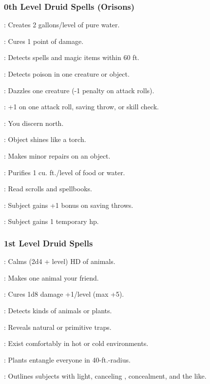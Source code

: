 \subsubsection{0th Level Druid Spells (Orisons)}

: Creates 2 gallons/level of pure water.

: Cures 1 point of damage.

: Detects spells and magic items within 60 ft.

: Detects poison in one creature or object.

: Dazzles one creature (-1 penalty on attack rolls).

: +1 on one attack roll, saving throw, or skill check.

: You discern north.

: Object shines like a torch.

: Makes minor repairs on an object.

: Purifies 1 cu. ft./level of food or water.

: Read scrolls and spellbooks.

: Subject gains +1 bonus on saving throws.

: Subject gains 1 temporary hp.

\subsubsection{1st Level Druid Spells}

: Calms (2d4 + level) HD of animals.

: Makes one animal your friend.

: Cures 1d8 damage +1/level (max +5).

: Detects kinds of animals or plants.

: Reveals natural or primitive traps.

: Exist comfortably in hot or cold environments.

: Plants entangle everyone in 40-ft.-radius.

: Outlines subjects with light, canceling , concealment, and the like.

